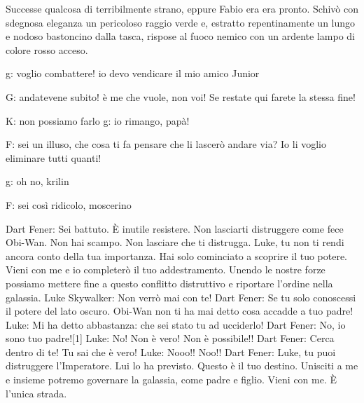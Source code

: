 Successe qualcosa di terribilmente strano, eppure Fabio era era pronto. Schivò con sdegnosa eleganza un pericoloso raggio verde e, estratto repentinamente un lungo e nodoso bastoncino dalla tasca, rispose al fuoco nemico con un ardente lampo di colore rosso acceso.

g: voglio combattere! io devo vendicare il mio amico Junior

G: andatevene subito! è me che vuole, non voi! Se restate qui farete la stessa fine!

K: non possiamo farlo
g: io rimango, papà!

F: sei un illuso, che cosa ti fa pensare che li lascerò andare via? Io li voglio eliminare tutti quanti!

g: oh no, krilin

F: sei così ridicolo, moscerino

Dart Fener: Sei battuto. È inutile resistere. Non lasciarti distruggere come fece Obi-Wan. Non hai scampo. Non lasciare che ti distrugga. Luke, tu non ti rendi ancora conto della tua importanza. Hai solo cominciato a scoprire il tuo potere. Vieni con me e io completerò il tuo addestramento. Unendo le nostre forze possiamo mettere fine a questo conflitto distruttivo e riportare l'ordine nella galassia.
Luke Skywalker: Non verrò mai con te!
Dart Fener: Se tu solo conoscessi il potere del lato oscuro. Obi-Wan non ti ha mai detto cosa accadde a tuo padre!
Luke: Mi ha detto abbastanza: che sei stato tu ad ucciderlo!
Dart Fener: No, io sono tuo padre![1]
Luke: No! Non è vero! Non è possibile!!
Dart Fener: Cerca dentro di te! Tu sai che è vero!
Luke: Nooo!! Noo!!
Dart Fener: Luke, tu puoi distruggere l'Imperatore. Lui lo ha previsto. Questo è il tuo destino. Unisciti a me e insieme potremo governare la galassia, come padre e figlio. Vieni con me. È l'unica strada.